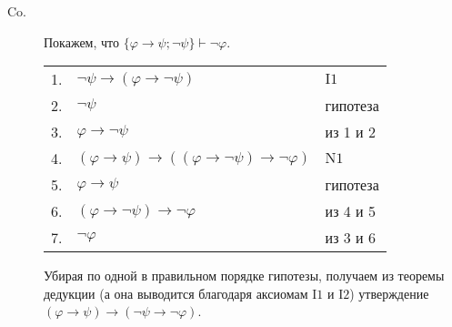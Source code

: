 \documentclass[12pt,a4paper]{article}
\begin{document}
\begin{enumproblem}
\begin{description}
            \item[$\mathrm{Co}$.] Покажем, что $\{\varphi \rightarrow \psi; \neg \psi\} \vdash \neg \varphi$.
                \begin{center}
                    \begin{tabular}{rll}
                        1.& $\neg \psi \rightarrow (\varphi \rightarrow \neg \psi)$& $\mathrm{I1}$\\
                        2.& $\neg \psi$& гипотеза\\
                        3.& $\varphi \rightarrow \neg \psi$& из 1 и 2\\
                        4.& $(\varphi \rightarrow \psi) \rightarrow ((\varphi \rightarrow \neg \psi) \rightarrow \neg \varphi)$& $\mathrm{N1}$\\
                        5.& $\varphi \rightarrow \psi$& гипотеза\\
                        6.& $(\varphi \rightarrow \neg \psi) \rightarrow \neg \varphi$& из 4 и 5\\
                        7.& $\neg \varphi$& из 3 и 6\\
                    \end{tabular}
                \end{center}
                Убирая по одной в правильном порядке гипотезы, получаем из теоремы дедукции (а она выводится благодаря аксиомам $\mathrm{I1}$ и $\mathrm{I2}$) утверждение $(\varphi \rightarrow \psi) \rightarrow (\neg \psi \rightarrow \neg \varphi)$.
        \end{description}
    \end{enumproblem}
\end{document}
